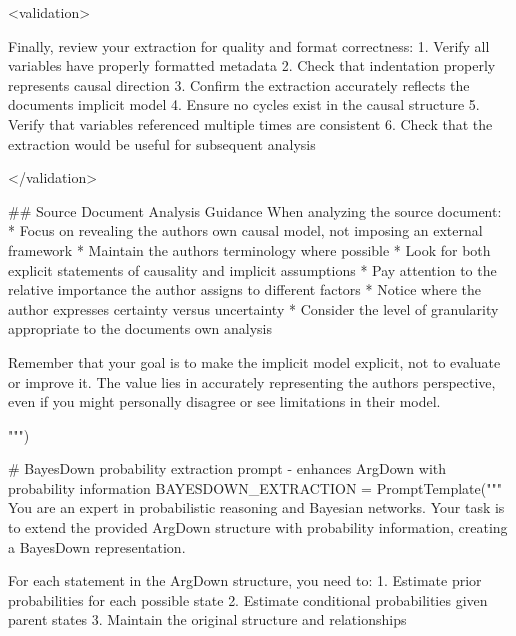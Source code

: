 \documentclass[
  11pt,
  letterpaper,
  openany]{book}
\newenvironment{Shaded}{\begin{snugshade}}{\end{snugshade}}
\newcommand{\CommentTok}[1]{\textcolor[rgb]{0.37,0.37,0.37}{#1}}
\newcommand{\NormalTok}[1]{\textcolor[rgb]{0.00,0.23,0.31}{#1}}
\newcommand{\OperatorTok}[1]{\textcolor[rgb]{0.37,0.37,0.37}{#1}}
\newcommand{\StringTok}[1]{\textcolor[rgb]{0.13,0.47,0.30}{#1}}
\begin{document}
\begin{landscape}
\begin{Shaded}
\begin{Highlighting}[]
\StringTok{\textless{}validation\textgreater{}}

\StringTok{Finally, review your extraction for quality and format correctness:}
\StringTok{1. Verify all variables have properly formatted metadata}
\StringTok{2. Check that indentation properly represents causal direction}
\StringTok{3. Confirm the extraction accurately reflects the document\textquotesingle{}s implicit model}
\StringTok{4. Ensure no cycles exist in the causal structure}
\StringTok{5. Verify that variables referenced multiple times are consistent}
\StringTok{6. Check that the extraction would be useful for subsequent analysis}

\StringTok{\textless{}/validation\textgreater{}}


\StringTok{\#\# Source Document Analysis Guidance}
\StringTok{When analyzing the source document:}
\StringTok{* Focus on revealing the author\textquotesingle{}s own causal model, not imposing an external framework}
\StringTok{* Maintain the author\textquotesingle{}s terminology where possible}
\StringTok{* Look for both explicit statements of causality and implicit assumptions}
\StringTok{* Pay attention to the relative importance the author assigns to different factors}
\StringTok{* Notice where the author expresses certainty versus uncertainty}
\StringTok{* Consider the level of granularity appropriate to the document\textquotesingle{}s own analysis}

\StringTok{Remember that your goal is to make the implicit model explicit, not to evaluate or improve it.}
\StringTok{The value lies in accurately representing the author\textquotesingle{}s perspective, even if you might personally disagree or see limitations in their model.}

\StringTok{"""}\NormalTok{)}

    \CommentTok{\# BayesDown probability extraction prompt {-} enhances ArgDown with probability information}
\NormalTok{    BAYESDOWN\_EXTRACTION }\OperatorTok{=}\NormalTok{ PromptTemplate(}\StringTok{"""}
\StringTok{You are an expert in probabilistic reasoning and Bayesian networks. Your task is}
\StringTok{to extend the provided ArgDown structure with probability information,}
\StringTok{creating a BayesDown representation.}

\StringTok{For each statement in the ArgDown structure, you need to:}
\StringTok{1. Estimate prior probabilities for each possible state}
\StringTok{2. Estimate conditional probabilities given parent states}
\StringTok{3. Maintain the original structure and relationships}


\end{Highlighting}
\end{Shaded}
\end{landscape}
\end{document}

